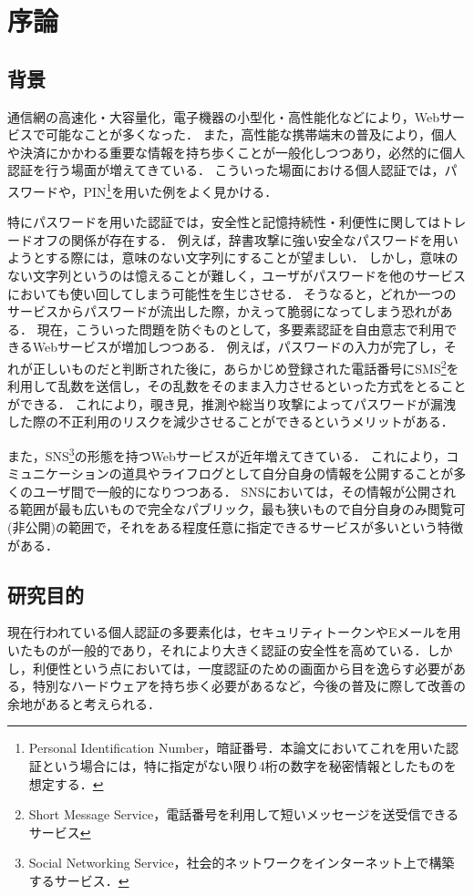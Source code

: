 \chapter{序論}\label{chap:introduction}
\section{背景}
通信網の高速化・大容量化，電子機器の小型化・高性能化などにより，Webサービスで可能なことが多くなった．
また，高性能な携帯端末の普及により，個人や決済にかかわる重要な情報を持ち歩くことが一般化しつつあり，必然的に個人認証を行う場面が増えてきている．
こういった場面における個人認証では，パスワードや，PIN\footnote{Personal Identification Number，暗証番号．本論文においてこれを用いた認証という場合には，特に指定がない限り4桁の数字を秘密情報としたものを想定する．}を用いた例をよく見かける．

特にパスワードを用いた認証では，安全性と記憶持続性・利便性に関してはトレードオフの関係が存在する．
例えば，辞書攻撃に強い安全なパスワードを用いようとする際には，意味のない文字列にすることが望ましい．
しかし，意味のない文字列というのは憶えることが難しく，ユーザがパスワードを他のサービスにおいても使い回してしまう可能性を生じさせる．
そうなると，どれか一つのサービスからパスワードが流出した際，かえって脆弱になってしまう恐れがある．
現在，こういった問題を防ぐものとして，多要素認証を自由意志で利用できるWebサービスが増加しつつある．
例えば，パスワードの入力が完了し，それが正しいものだと判断された後に，あらかじめ登録された電話番号にSMS\footnote{Short Message Service，電話番号を利用して短いメッセージを送受信できるサービス}を利用して乱数を送信し，その乱数をそのまま入力させるといった方式をとることができる．
これにより，覗き見，推測や総当り攻撃によってパスワードが漏洩した際の不正利用のリスクを減少させることができるというメリットがある．

また，SNS\footnote{Social Networking Service，社会的ネットワークをインターネット上で構築するサービス．}の形態を持つWebサービスが近年増えてきている．
これにより，コミュニケーションの道具やライフログとして自分自身の情報を公開することが多くのユーザ間で一般的になりつつある．
SNSにおいては，その情報が公開される範囲が最も広いもので完全なパブリック，最も狭いもので自分自身のみ閲覧可(非公開)の範囲で，それをある程度任意に指定できるサービスが多いという特徴がある．

\section{研究目的}
現在行われている個人認証の多要素化は，セキュリティトークンやEメールを用いたものが一般的であり，それにより大きく認証の安全性を高めている．しかし，利便性という点においては，一度認証のための画面から目を逸らす必要がある，特別なハードウェアを持ち歩く必要があるなど，今後の普及に際して改善の余地があると考えられる．

